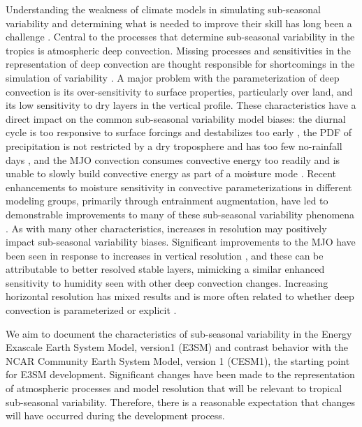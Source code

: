 \documentclass[draft,ms]{AGUTeX}
\begin{document}
\begin{article}
Understanding the weakness of climate models in simulating sub-seasonal variability and determining what is needed to improve their skill has long been a challenge \citep{Zhang2013}. Central to the processes that determine sub-seasonal variability in the tropics is atmospheric deep convection. Missing processes and sensitivities in the representation of deep convection are thought responsible for shortcomings in the simulation of variability \citep{Kim2014}. A major problem with the parameterization of deep convection is its over-sensitivity to surface properties, particularly over land, and its low sensitivity to dry layers in the vertical profile. These characteristics have a direct impact on the common sub-seasonal variability model biases: the diurnal cycle is too responsive to surface forcings and destabilizes too early \citep{Yuan2013}, the PDF of precipitation is not restricted by a dry troposphere and has too few no-rainfall days \citep{Hirota2014}, and the MJO convection consumes convective energy too readily and is unable to slowly build convective energy as part of a moisture mode \citep{Kim2014}. Recent enhancements to moisture sensitivity in convective parameterizations in different modeling groups, primarily through entrainment augmentation, have led to demonstrable improvements to many of these sub-seasonal variability phenomena \citep[e.g.,][]{Neale2008,Zhou2012,Tokioka1988,Oueslati2013}. As with many other characteristics, increases in resolution may positively impact sub-seasonal variability biases. Significant improvements to the MJO have been seen in response to increases in vertical resolution \citep{Inness2001a}, and these can be attributable to better resolved stable layers, mimicking a similar enhanced sensitivity to humidity seen with other deep convection changes. Increasing horizontal resolution has mixed results \citep[e.g.,][]{Jia2008} and is more often related to whether deep convection is parameterized or explicit \citep{Holloway2013}.

We aim to document the characteristics of sub-seasonal variability in the Energy Exascale Earth System Model, version1 (E3SM) and contrast behavior with the NCAR Community Earth System Model, version 1 (CESM1), the starting point for E3SM development. Significant changes have been made to the representation of atmospheric processes and model resolution that will be relevant to tropical sub-seasonal variability. Therefore, there is a reasonable expectation that changes will have occurred during the development process.


\end{article}
\end{document}
